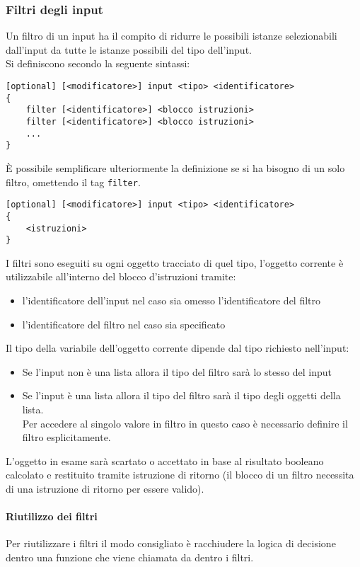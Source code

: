 \subsubsection{Filtri degli input}
Un filtro di un input ha il compito di ridurre le possibili istanze selezionabili dall'input da tutte
le istanze possibili del tipo dell'input. \\
Si definiscono secondo la seguente sintassi:
\begin{lstlisting}
[optional] [<modificatore>] input <tipo> <identificatore> 
{
    filter [<identificatore>] <blocco istruzioni>
    filter [<identificatore>] <blocco istruzioni>
    ...
}
\end{lstlisting}
È possibile semplificare ulteriormente la definizione se si ha bisogno di un solo filtro, omettendo
il tag \verb|filter|.
\begin{lstlisting}
[optional] [<modificatore>] input <tipo> <identificatore> 
{
    <istruzioni>
}
\end{lstlisting}
I filtri sono eseguiti su ogni oggetto tracciato di quel tipo, l'oggetto corrente è utilizzabile 
all'interno del blocco d'istruzioni tramite:
\begin{itemize}
    \item l'identificatore dell'input nel caso sia omesso l'identificatore del filtro
    \item l'identificatore del filtro nel caso sia specificato
\end{itemize}
Il tipo della variabile dell'oggetto corrente dipende dal tipo richiesto nell'input:
\begin{itemize}
    \item Se l'input non è una lista allora il tipo del filtro sarà lo stesso del input 
    \item { 
        Se l'input è una lista allora il tipo del filtro sarà il tipo degli oggetti della lista. \\
        Per accedere al singolo valore in filtro in questo caso è necessario definire il filtro esplicitamente.
    }
\end{itemize} 
L'oggetto in esame sarà scartato o accettato in base al risultato booleano calcolato e restituito tramite 
istruzione di ritorno (il blocco di un filtro necessita di una istruzione di ritorno per essere valido).

\paragraph{Riutilizzo dei filtri}
Per riutilizzare i filtri il modo consigliato è racchiudere la logica di decisione dentro una funzione
che viene chiamata da dentro i filtri. 

